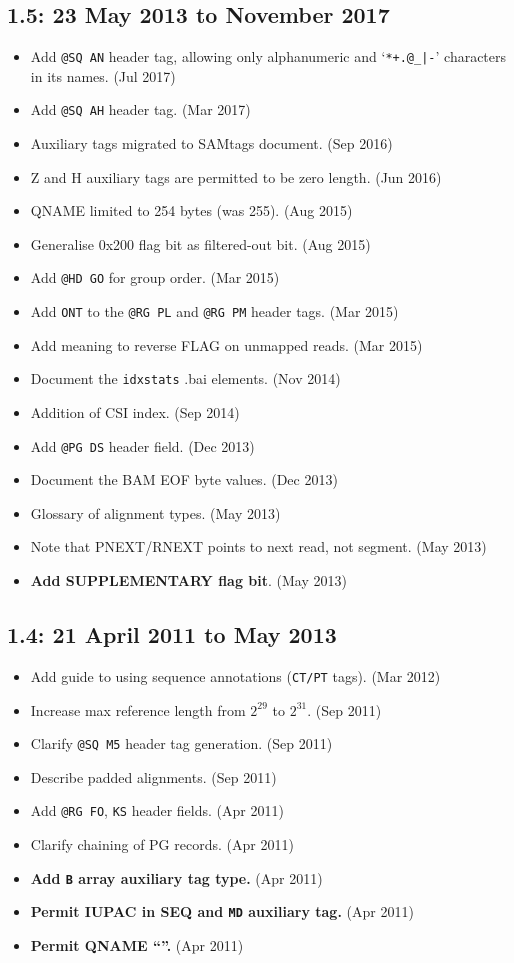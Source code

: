 \documentclass[10pt]{article}
\begin{document}
\begin{appendices}
\subsection*{1.5: 23 May 2013 to November 2017}

\begin{itemize}
\item Add {\tt @SQ AN} header tag, allowing only alphanumeric and `\verb"*+.@_|-"' characters in its names. (Jul 2017)
\item Add {\tt @SQ AH} header tag. (Mar 2017)
\item Auxiliary tags migrated to SAMtags document. (Sep 2016)
\item Z and H auxiliary tags are permitted to be zero length. (Jun 2016)
\item QNAME limited to 254 bytes (was 255). (Aug 2015)
\item Generalise 0x200 flag bit as filtered-out bit. (Aug 2015)
\item Add {\tt @HD GO} for group order. (Mar 2015)
\item Add {\tt ONT} to the {\tt @RG PL} and {\tt @RG PM} header tags. (Mar 2015)
\item Add meaning to reverse FLAG on unmapped reads. (Mar 2015)
\item Document the {\tt idxstats} .bai elements. (Nov 2014)
\item Addition of CSI index. (Sep 2014)
\item Add {\tt @PG DS} header field. (Dec 2013)
\item Document the BAM EOF byte values. (Dec 2013)
\item Glossary of alignment types. (May 2013)
\item Note that PNEXT/RNEXT points to next read, not segment. (May 2013)
\item \textbf{Add SUPPLEMENTARY flag bit}. (May 2013)
\end{itemize}

\subsection*{1.4: 21 April 2011 to May 2013}

\begin{itemize}
\item Add guide to using sequence annotations ({\tt CT/PT} tags). (Mar 2012)
\item Increase max reference length from $2^{29}$ to $2^{31}$. (Sep
  2011)
\item Clarify {\tt @SQ M5} header tag generation. (Sep 2011)
\item Describe padded alignments. (Sep 2011)
\item Add {\tt @RG FO}, {\tt KS} header fields. (Apr 2011)
\item Clarify chaining of PG records. (Apr 2011)
\item \textbf{Add {\tt B} array auxiliary tag type.} (Apr 2011)\
\item \textbf{Permit IUPAC in SEQ and {\tt MD} auxiliary tag.} (Apr 2011)
\item \textbf{Permit QNAME ``{\tt *}''.} (Apr 2011)
\end{itemize}


\end{appendices}
\end{document}
